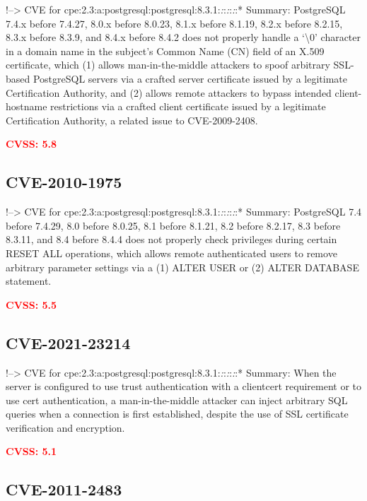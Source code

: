 \documentclass[a4paper, 12pt]{article}
\begin{document}
!--\textgreater{} CVE for
cpe:2.3:a:postgresql:postgresql:8.3.1:\emph{:}:\emph{:}:\emph{:}:*
Summary: PostgreSQL 7.4.x before 7.4.27, 8.0.x before 8.0.23, 8.1.x
before 8.1.19, 8.2.x before 8.2.15, 8.3.x before 8.3.9, and 8.4.x before
8.4.2 does not properly handle a `\textbackslash0' character in a domain
name in the subject's Common Name (CN) field of an X.509 certificate,
which (1) allows man-in-the-middle attackers to spoof arbitrary
SSL-based PostgreSQL servers via a crafted server certificate issued by
a legitimate Certification Authority, and (2) allows remote attackers to
bypass intended client-hostname restrictions via a crafted client
certificate issued by a legitimate Certification Authority, a related
issue to CVE-2009-2408.

\textbf{\textcolor{red}{CVSS: 5.8}}

\hypertarget{cve-2010-1975}{%
\subsection{CVE-2010-1975}\label{cve-2010-1975}}

!--\textgreater{} CVE for
cpe:2.3:a:postgresql:postgresql:8.3.1:\emph{:}:\emph{:}:\emph{:}:*
Summary: PostgreSQL 7.4 before 7.4.29, 8.0 before 8.0.25, 8.1 before
8.1.21, 8.2 before 8.2.17, 8.3 before 8.3.11, and 8.4 before 8.4.4 does
not properly check privileges during certain RESET ALL operations, which
allows remote authenticated users to remove arbitrary parameter settings
via a (1) ALTER USER or (2) ALTER DATABASE statement.

\textbf{\textcolor{red}{CVSS: 5.5}}

\hypertarget{cve-2021-23214}{%
\subsection{CVE-2021-23214}\label{cve-2021-23214}}

!--\textgreater{} CVE for
cpe:2.3:a:postgresql:postgresql:8.3.1:\emph{:}:\emph{:}:\emph{:}:*
Summary: When the server is configured to use trust authentication with
a clientcert requirement or to use cert authentication, a
man-in-the-middle attacker can inject arbitrary SQL queries when a
connection is first established, despite the use of SSL certificate
verification and encryption.

\textbf{\textcolor{red}{CVSS: 5.1}}

\hypertarget{cve-2011-2483}{%
\subsection{CVE-2011-2483}\label{cve-2011-2483}}
\end{document}

